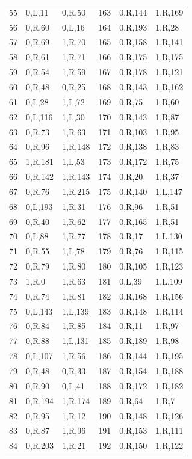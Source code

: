 \begin{longtable}{rll@{\hspace{12mm}}rll}
55 & 0,L,11 & 0,R,50 & 163 & 0,R,144 & 1,R,169\\
56 & 0,R,60 & 0,L,16 & 164 & 0,R,193 & 1,R,28\\
57 & 0,R,69 & 1,R,70 & 165 & 0,R,158 & 1,R,141\\
58 & 0,R,61 & 1,R,71 & 166 & 0,R,175 & 1,R,175\\
59 & 0,R,54 & 1,R,59 & 167 & 0,R,178 & 1,R,121\\
60 & 0,R,48 & 0,R,25 & 168 & 0,R,143 & 1,R,162\\
61 & 0,L,28 & 1,L,72 & 169 & 0,R,75 & 1,R,60\\
62 & 0,L,116 & 1,L,30 & 170 & 0,R,143 & 1,R,87\\
63 & 0,R,73 & 1,R,63 & 171 & 0,R,103 & 1,R,95\\
64 & 0,R,96 & 1,R,148 & 172 & 0,R,138 & 1,R,83\\
65 & 1,R,181 & 1,L,53 & 173 & 0,R,172 & 1,R,75\\
66 & 0,R,142 & 1,R,143 & 174 & 0,R,20 & 1,R,37\\
67 & 0,R,76 & 1,R,215 & 175 & 0,R,140 & 1,L,147\\
68 & 0,L,193 & 1,R,31 & 176 & 0,R,96 & 1,R,51\\
69 & 0,R,40 & 1,R,62 & 177 & 0,R,165 & 1,R,51\\
70 & 0,L,88 & 1,R,77 & 178 & 0,R,17 & 1,L,130\\
71 & 0,R,55 & 1,L,78 & 179 & 0,R,76 & 1,R,115\\
72 & 0,R,79 & 1,R,80 & 180 & 0,R,105 & 1,R,123\\
73 & 1,R,0 & 1,R,63 & 181 & 0,L,39 & 1,L,109\\
74 & 0,R,74 & 1,R,81 & 182 & 0,R,168 & 1,R,156\\
75 & 0,L,143 & 1,L,139 & 183 & 0,R,148 & 1,R,114\\
76 & 0,R,84 & 1,R,85 & 184 & 0,R,11 & 1,R,97\\
77 & 0,R,88 & 1,L,131 & 185 & 0,R,189 & 1,R,98\\
78 & 0,L,107 & 1,R,56 & 186 & 0,R,144 & 1,R,195\\
79 & 0,R,48 & 0,R,33 & 187 & 0,R,154 & 1,R,188\\
80 & 0,R,90 & 0,L,41 & 188 & 0,R,172 & 1,R,182\\
81 & 0,R,194 & 1,R,174 & 189 & 0,R,64 & 1,R,7\\
82 & 0,R,95 & 1,R,12 & 190 & 0,R,148 & 1,R,126\\
83 & 0,R,87 & 1,R,96 & 191 & 0,R,153 & 1,R,111\\
84 & 0,R,203 & 1,R,21 & 192 & 0,R,150 & 1,R,122\\

\end{longtable}
